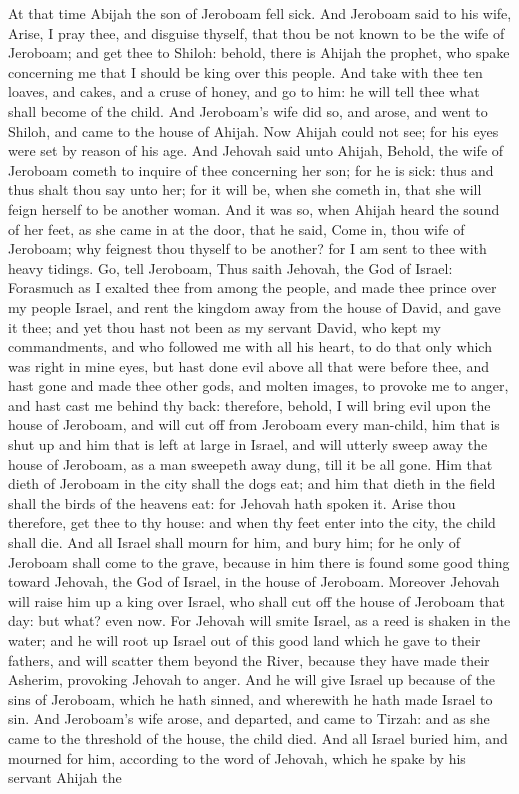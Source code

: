 At that time Abijah the son of Jeroboam fell sick. And Jeroboam said to his wife, Arise, I pray thee, and disguise thyself, that thou be not known to be the wife of Jeroboam; and get thee to Shiloh: behold, there is Ahijah the prophet, who spake concerning me that I should be king over this people. And take with thee ten loaves, and cakes, and a cruse of honey, and go to him: he will tell thee what shall become of the child. And Jeroboam’s wife did so, and arose, and went to Shiloh, and came to the house of Ahijah. Now Ahijah could not see; for his eyes were set by reason of his age. And Jehovah said unto Ahijah, Behold, the wife of Jeroboam cometh to inquire of thee concerning her son; for he is sick: thus and thus shalt thou say unto her; for it will be, when she cometh in, that she will feign herself to be another woman.  And it was so, when Ahijah heard the sound of her feet, as she came in at the door, that he said, Come in, thou wife of Jeroboam; why feignest thou thyself to be another? for I am sent to thee with heavy tidings. Go, tell Jeroboam, Thus saith Jehovah, the God of Israel: Forasmuch as I exalted thee from among the people, and made thee prince over my people Israel, and rent the kingdom away from the house of David, and gave it thee; and yet thou hast not been as my servant David, who kept my commandments, and who followed me with all his heart, to do that only which was right in mine eyes, but hast done evil above all that were before thee, and hast gone and made thee other gods, and molten images, to provoke me to anger, and hast cast me behind thy back: therefore, behold, I will bring evil upon the house of Jeroboam, and will cut off from Jeroboam every man-child, him that is shut up and him that is left at large in Israel, and will utterly sweep away the house of Jeroboam, as a man sweepeth away dung, till it be all gone. Him that dieth of Jeroboam in the city shall the dogs eat; and him that dieth in the field shall the birds of the heavens eat: for Jehovah hath spoken it. Arise thou therefore, get thee to thy house: and when thy feet enter into the city, the child shall die. And all Israel shall mourn for him, and bury him; for he only of Jeroboam shall come to the grave, because in him there is found some good thing toward Jehovah, the God of Israel, in the house of Jeroboam. Moreover Jehovah will raise him up a king over Israel, who shall cut off the house of Jeroboam that day: but what? even now. For Jehovah will smite Israel, as a reed is shaken in the water; and he will root up Israel out of this good land which he gave to their fathers, and will scatter them beyond the River, because they have made their Asherim, provoking Jehovah to anger. And he will give Israel up because of the sins of Jeroboam, which he hath sinned, and wherewith he hath made Israel to sin.  And Jeroboam’s wife arose, and departed, and came to Tirzah: and as she came to the threshold of the house, the child died. And all Israel buried him, and mourned for him, according to the word of Jehovah, which he spake by his servant Ahijah the 